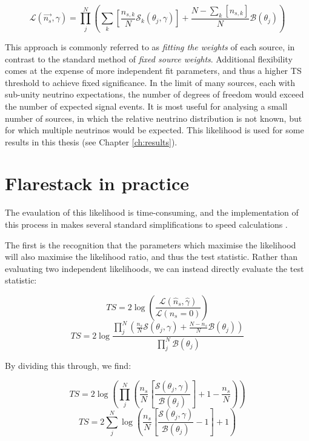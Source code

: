 \begin{equation}
	\mathcal{L}(\vec{n_{s}}, \gamma) = \prod_{j}^{N} \left(\sum_{k} \left[ \frac{n_{s, k}}{N} \mathcal{S}_{k}(\theta_{j}, \gamma) \right]+ \frac{N - \sum_{k} \left[ n_{s, k} \right] }{N} \mathcal{B}(\theta_{j})  \right)
\end{equation}

This approach is commonly referred to as \emph{fitting the weights} of each source, in contrast to the standard method of \emph{fixed source weights}. Additional flexibility comes at the expense of more independent fit parameters, and thus a higher TS threshold to achieve fixed significance. In the limit of many sources, each with sub-unity neutrino expectations, the number of degrees of freedom would exceed the number of expected signal events. It is most useful for analysing a small number of sources, in which the relative neutrino distribution is not known, but for which multiple neutrinos would be expected. This likelihood is used for some results in this thesis (see Chapter \ref{ch:results}).

\section{Flarestack in practice}
The evaulation of this likelihood is time-consuming, and the implementation of this process in  \flarestack{} makes several standard simplifications to speed calculations . 


The first is the recognition that the parameters which maximise the likelihood will also maximise the likelihood ratio, and thus the test statistic. Rather than evaluating two independent likelihoods, we can instead directly evaluate the test statistic:

\begin{equation}
	TS = 2 \log \left( \frac{ \mathcal{L}(\hat{n}_{s}, \hat{\gamma}) }{\mathcal{L}(n_{s} = 0)} \right)
\end{equation}
\begin{equation}
TS = 2 \log  \frac{\prod_{j}^{N} \left(\frac{n_{s}}{N} \mathcal{S}(\theta_{j}, \gamma) + \frac{N - n_{s}}{N} \mathcal{B}(\theta_{j})  \right)}{\prod_{j}^{N}\mathcal{B}(\theta_{j})}
\end{equation}

By dividing this through, we find: 

\begin{equation}
	TS =  2 \log \left(  \prod_{j}^{N} \left(\frac{n_{s}}{N} \left[\frac{\mathcal{S}(\theta_{j}, \gamma)}{\mathcal{B}(\theta_{j})} \right] + 1 - \frac{n_{s}}{N} \right) \right) 
\end{equation}
\begin{equation}
	TS = 2 \sum_{j}^{N} \log \left(\frac{n_{s}}{N} \left[ \frac{\mathcal{S}(\theta_{j}, \gamma)}{\mathcal{B}(\theta_{j}) } - 1 \right] + 1 \right) 
\label{eq:TS_reduced}
\end{equation}

